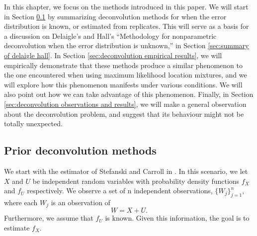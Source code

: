 
	In this chapter, we focus on the methods introduced in this paper. We will start in Section \ref{sec:summary of basic deconvolution} by summarizing deconvolution methods for when the error distribution is known, or estimated from replicates. This will serve as a basis for a discussion on Delaigle's and Hall's ``Methodology for nonparametric deconvolution when the error distribution is unknown,'' in Section \ref{sec:summary of delaigle hall}. In Section \ref{sec:deconvolution empirical results}, we will empirically demonstrate that these methods produce a similar phenomenon to the one encountered when using maximum likelihood location mixtures, and we will explore how this phenomenon manifests under various conditions. We will also point out how we can take advantage of this phenomenon. 
	Finally, in Section \ref{sec:deconvolution observations and results}, we will make a general observation about the deconvolution problem, and suggest that its behaviour might not be totally unexpected.


\subsection{Prior deconvolution methods}
\label{sec:summary of basic deconvolution}
	We start with the estimator of Stefanski and Carroll in \cite{Stefanski1990-uo}. In this scenario, we let $X$ and $U$ be independent random variables with probability density functions $f_X$ and $f_U$ respectively. We observe a set of n independent observations, $\{W_j\}_{j = 1}^n$, where each $W_j$ is an observation of 
	\begin{equation}
		W = X + U.
	\end{equation}
	Furthermore, we assume that $f_U$ is known. Given this information, the goal is to estimate $f_X$.


